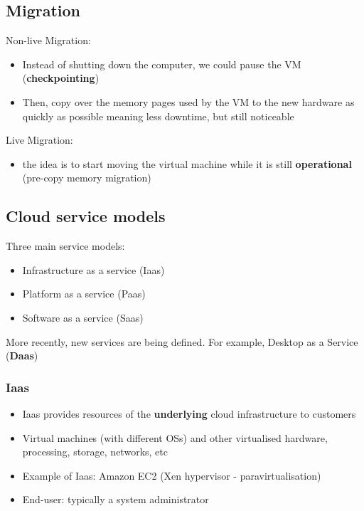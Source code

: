 \documentclass{article}
\begin{document}
\subsection{Migration}
\begin{flushleft}
Non-live Migration:
\begin{itemize}
	\item  Instead of shutting down the computer, we could pause the VM (\textbf{checkpointing})
	\item Then, copy over the memory pages used by the VM to the new hardware as quickly as possible meaning less downtime, but still noticeable 
\end{itemize}
Live Migration:
\begin{itemize}
	\item the idea is to start moving the virtual machine while it is still \textbf{operational} (pre-copy memory migration)
\end{itemize}
\end{flushleft}

\subsection{Cloud service models}
\begin{flushleft}
Three main service models:
\begin{itemize}
	\item Infrastructure as a service (Iaas)
	\item Platform as a service (Paas)
	\item Software as a service (Saas)
\end{itemize}
More recently, new services are being defined. For example, Desktop as a Service (\textbf{Daas})
\end{flushleft}

\subsubsection{Iaas}
\begin{itemize}
	\item Iaas provides resources of the \textbf{underlying} cloud infrastructure to customers
	\item Virtual machines (with different OSs) and other virtualised hardware, processing, storage, networks, etc 
	\item Example of Iaas: Amazon EC2 (Xen hypervisor - paravirtualisation)
	\item End-user: typically a system administrator
\end{itemize}
\end{document}

